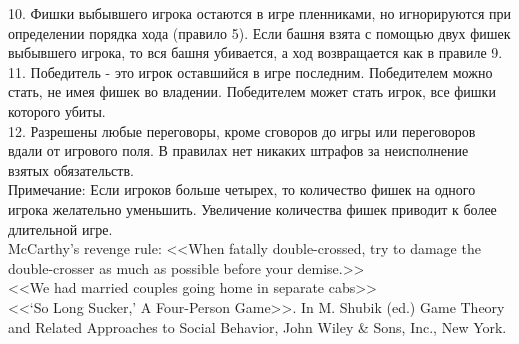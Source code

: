 {10. Фишки выбывшего игрока остаются в игре пленниками, но игнорируются при определении порядка хода (правило 5). Если башня взята с помощью двух фишек выбывшего игрока, то вся башня убивается, а ход возвращается как в правиле 9.\\
11. Победитель - это игрок оставшийся в игре последним. Победителем можно стать, не имея фишек во владении. Победителем может стать игрок, все фишки которого убиты.\\
12. Разрешены любые переговоры, кроме сговоров до игры или переговоров вдали от игрового поля. В правилах нет никаких штрафов за неисполнение взятых обязательств.\\
Примечание: Если игроков больше четырех, то количество фишек на одного игрока желательно уменьшить. Увеличение количества фишек приводит к более длительной игре.\\
McCarthy's revenge rule: <<When fatally double-crossed, try to damage the double-crosser as much as possible before your demise.>>\\
<<We had married couples going home in separate cabs>>\\
<<`So Long Sucker,' A Four-Person Game>>. In M. Shubik (ed.) Game Theory and Related Approaches to Social Behavior, John Wiley \& Sons, Inc., New York.}
\solution{}




\solution{}



